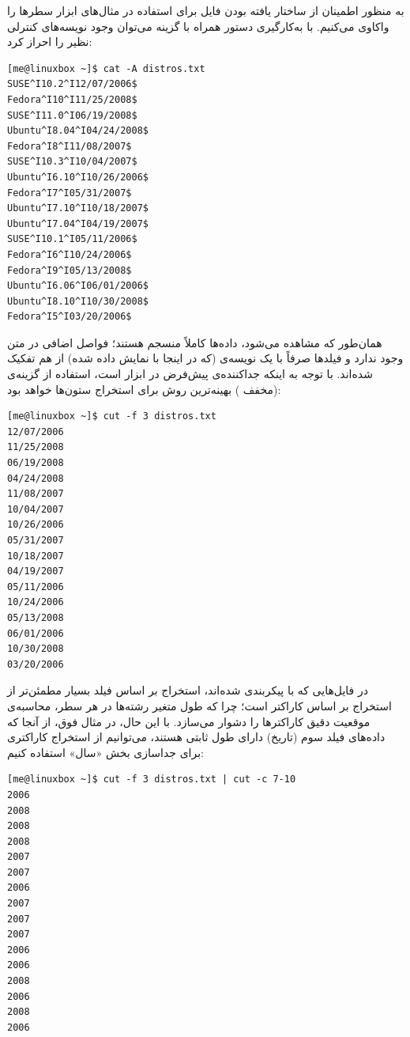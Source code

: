به منظور اطمینان از ساختار یافته بودن فایل  برای استفاده در مثال‌های ابزار  سطرها را واکاوی می‌کنیم. با به‌کارگیری دستور  همراه با گزینه  می‌توان وجود نویسه‌های کنترلی نظیر  را احراز کرد:

\begin{latin}
\begin{lstlisting}
[me@linuxbox ~]$ cat -A distros.txt
SUSE^I10.2^I12/07/2006$
Fedora^I10^I11/25/2008$
SUSE^I11.0^I06/19/2008$
Ubuntu^I8.04^I04/24/2008$
Fedora^I8^I11/08/2007$
SUSE^I10.3^I10/04/2007$
Ubuntu^I6.10^I10/26/2006$
Fedora^I7^I05/31/2007$
Ubuntu^I7.10^I10/18/2007$
Ubuntu^I7.04^I04/19/2007$
SUSE^I10.1^I05/11/2006$
Fedora^I6^I10/24/2006$
Fedora^I9^I05/13/2008$
Ubuntu^I6.06^I06/01/2006$
Ubuntu^I8.10^I10/30/2008$
Fedora^I5^I03/20/2006$
\end{lstlisting}
\end{latin}

همان‌طور که مشاهده می‌شود، داده‌ها کاملاً منسجم هستند؛ فواصل اضافی در متن وجود ندارد و فیلدها صرفاً با یک نویسه‌ی  (که در اینجا با  نمایش داده شده) از هم تفکیک شده‌اند. با توجه به اینکه  جداکننده‌ی پیش‌فرض در ابزار  است، استفاده از گزینه‌ی  (مخفف ) بهینه‌ترین روش برای استخراج ستون‌ها خواهد بود:

\begin{latin}
\begin{lstlisting}
[me@linuxbox ~]$ cut -f 3 distros.txt
12/07/2006
11/25/2008
06/19/2008
04/24/2008
11/08/2007
10/04/2007
10/26/2006
05/31/2007
10/18/2007
04/19/2007
05/11/2006
10/24/2006
05/13/2008
06/01/2006
10/30/2008
03/20/2006
\end{lstlisting}
\end{latin}

در فایل‌هایی که با  پیکربندی شده‌اند، استخراج بر اساس فیلد بسیار مطمئن‌تر از استخراج بر اساس کاراکتر است؛ چرا که طول متغیر رشته‌ها در هر سطر، محاسبه‌ی موقعیت دقیق کاراکترها را دشوار می‌سازد. با این حال، در مثال فوق، از آنجا که داده‌های فیلد سوم (تاریخ) دارای طول ثابتی هستند، می‌توانیم از استخراج کاراکتری برای جداسازی بخش «سال» استفاده کنیم:

\begin{latin}
\begin{lstlisting}
[me@linuxbox ~]$ cut -f 3 distros.txt | cut -c 7-10
2006
2008
2008
2008
2007
2007
2006
2007
2007
2007
2006
2006
2008
2006
2008
2006
\end{lstlisting}
\end{latin}

